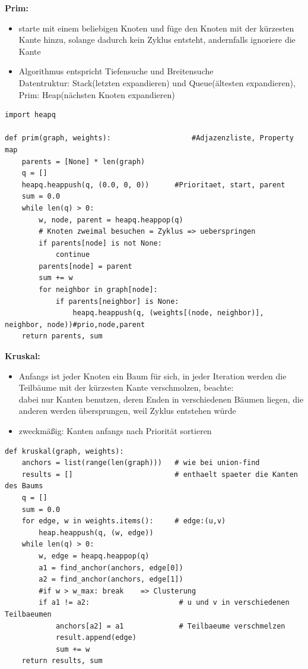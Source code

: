 \documentclass[11pt, fleqn]{scrreprt}
\begin{document}
    \textbf{Prim:} \begin{itemize}
        \item starte mit einem beliebigen Knoten und füge den Knoten mit der kürzesten Kante hinzu, solange dadurch kein Zyklus entsteht, andernfalls ignoriere die Kante
        \item Algorithmus entspricht Tiefensuche und Breitensuche\\
        Datentruktur: Stack(letzten expandieren) und Queue(ältesten expandieren), Prim: Heap(nächsten Knoten expandieren)
    \end{itemize}

    \begin{verbatim}
import heapq

def prim(graph, weights):                   #Adjazenzliste, Property map
    parents = [None] * len(graph)
    q = []
    heapq.heappush(q, (0.0, 0, 0))      #Prioritaet, start, parent
    sum = 0.0
    while len(q) > 0:
        w, node, parent = heapq.heappop(q)
        # Knoten zweimal besuchen = Zyklus => ueberspringen
        if parents[node] is not None:
            continue
        parents[node] = parent
        sum += w
        for neighbor in graph[node]:
            if parents[neighbor] is None:
                heapq.heappush(q, (weights[(node, neighbor)], neighbor, node))#prio,node,parent
    return parents, sum
    \end{verbatim}

    \textbf{Kruskal:}
    \begin{itemize}
        \item Anfangs ist jeder Knoten ein Baum für sich, in jeder Iteration werden die Teilbäume mit der kürzesten Kante verschmolzen, beachte:\\
        dabei nur Kanten benutzen, deren Enden in verschiedenen Bäumen liegen, die anderen werden übersprungen, weil Zyklus entstehen würde
        \item zweckmäßig: Kanten anfangs nach Priorität sortieren
    \end{itemize}

    \begin{verbatim}
def kruskal(graph, weights):
    anchors = list(range(len(graph)))   # wie bei union-find
    results = []                        # enthaelt spaeter die Kanten des Baums
    q = []
    sum = 0.0
    for edge, w in weights.items():     # edge:(u,v)
        heap.heappush(q, (w, edge))
    while len(q) > 0:
        w, edge = heapq.heappop(q)
        a1 = find_anchor(anchors, edge[0])
        a2 = find_anchor(anchors, edge[1])
        #if w > w_max: break    => Clusterung
        if a1 != a2:                     # u und v in verschiedenen Teilbaeumen
            anchors[a2] = a1             # Teilbaeume verschmelzen
            result.append(edge)
            sum += w
    return results, sum
    \end{verbatim}
\end{document}
